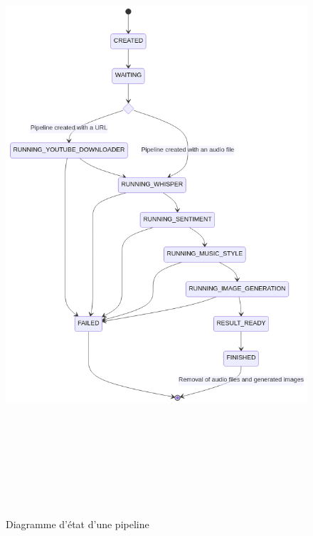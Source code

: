 \begin{figure}[H]
    \begin{center}
        \includegraphics[height=23cm,]{rsc/orchestrator_state_diagram.png}
        \caption{Diagramme d'état d'une pipeline}
        \label{fig:state_diagram}
    \end{center}
\end{figure}

